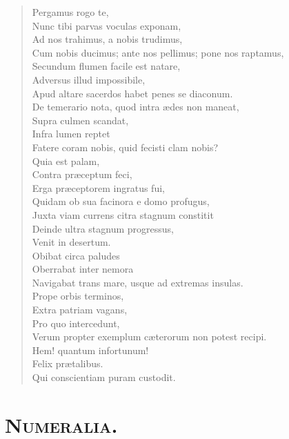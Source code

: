 \begin{verse}

  Pergamus rogo te,\\
  Nunc tibi parvas voculas exponam,\\
  Ad nos trahimus, a nobis trudimus,\\
  Cum nobis ducimus; ante nos pellimus; pone nos raptamus,\\
  Secundum flumen facile est natare,\\
  Adversus illud impossibile,\\
  Apud altare sacerdos habet penes se diaconum.\\
  De temerario nota, quod intra ædes non maneat,\\
  Supra culmen scandat,\\
  Infra lumen reptet\\
  Fatere coram nobis, quid fecisti clam nobis?\\
  Quia est palam,\\
  Contra præceptum feci,\\
  Erga præceptorem ingratus fui,\\
  Quidam ob sua facinora e domo profugus,\\
  Juxta viam currens citra stagnum constitit\\
  Deinde ultra stagnum progressus,\\
  Venit in desertum.\\
  Obibat circa paludes\\
  Oberrabat inter nemora\\
  Navigabat trans mare, usque ad extremas insulas.\\
  Prope orbis terminos,\\
  Extra patriam vagans,\\
  Pro quo intercedunt,\\
  Verum propter exemplum cæterorum non potest recipi.\\
  Hem! quantum infortunum!\\
  Felix prætalibus.\\
  Qui conscientiam puram custodit.\\
\end{verse}



\section*{\textsc{Numeralia.}}


